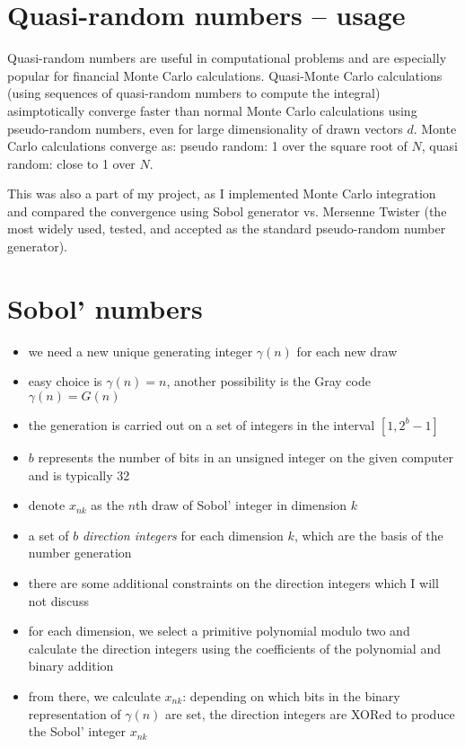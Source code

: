 \documentclass[11pt]{article}
\begin{document}
\section{Quasi-random numbers -- usage}
Quasi-random numbers are useful in computational problems and are especially popular for financial Monte Carlo calculations. Quasi-Monte Carlo calculations (using sequences of quasi-random numbers to compute the integral) asimptotically converge faster than normal Monte Carlo calculations using pseudo-random numbers, even for large dimensionality of drawn vectors $d$. Monte Carlo calculations converge as: pseudo random: 1 over the square root of $N$, quasi random: close to 1 over $N$.

This was also a part of my project, as I implemented Monte Carlo integration and compared the convergence using Sobol generator vs. Mersenne Twister (the most widely used, tested, and accepted as the standard pseudo-random number generator).

\section{Sobol' numbers}
\begin{itemize}
    \item we need a new unique generating integer $\gamma(n)$ for each new draw \item easy choice is $\gamma (n) = n$, another possibility is the Gray code $\gamma (n) = G(n)$
    \item the generation is carried out on a set of integers in the interval $[1, 2^b-1]$
    \item $b$ represents the number of bits in an unsigned integer on the given computer and is typically 32
    \item denote $x_{nk}$ as the $n$th draw of Sobol' integer in dimension $k$
    \item a set of $b$ \emph{direction integers} for each dimension $k$, which are the basis of the number generation
    \item there are some additional constraints on the direction integers which I will not discuss
    \item for each dimension, we select a primitive polynomial modulo two and calculate the direction integers using the coefficients of the polynomial and binary addition
    \item from there, we calculate $x_{nk}$: depending on which bits in the binary representation of $\gamma(n)$ are set, the direction integers are XORed to produce the Sobol' integer $x_{nk}$
\end{itemize}
\end{document}
